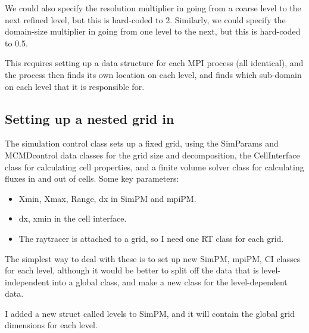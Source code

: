 \documentclass[a4paper,11pt]{article}
\begin{document}
We could also specify the resolution multiplier in going from a coarse level to the next refined level, but this is hard-coded to 2.
Similarly, we could specify the domain-size multiplier in going from one level to the next, but this is hard-coded to 0.5.

This requires setting up a data structure for each MPI process (all identical), and the process then finds its own location on each level, and finds which sub-domain on each level that it is responsible for.


\subsection{Setting up a nested grid in \pion{}}
The simulation control class sets up a fixed grid, using the SimParams and MCMDcontrol data classes for the grid size and decomposition, the CellInterface class for calculating cell properties, and a finite volume solver class for calculating fluxes in and out of cells.
Some key parameters:
\begin{itemize}
\item Xmin, Xmax, Range, dx in SimPM and mpiPM.
\item dx, xmin in the cell interface.
\item The raytracer is attached to a grid, so I need one RT class for each grid.
\end{itemize}
The simplest way to deal with these is to set up new SimPM, mpiPM, CI classes for each level, although it would be better to split off the data that is level-independent into a global class, and make a new class for the level-dependent data.

I added a new struct called levels to SimPM, and it will contain the global grid dimensions for each level.



\end{document}

